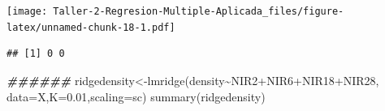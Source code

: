 \documentclass[
]{article}
\newenvironment{Shaded}{\begin{snugshade}}{\end{snugshade}}
\newcommand{\AttributeTok}[1]{\textcolor[rgb]{0.77,0.63,0.00}{#1}}
\newcommand{\DecValTok}[1]{\textcolor[rgb]{0.00,0.00,0.81}{#1}}
\newcommand{\DocumentationTok}[1]{\textcolor[rgb]{0.56,0.35,0.01}{\textbf{\textit{#1}}}}
\newcommand{\FloatTok}[1]{\textcolor[rgb]{0.00,0.00,0.81}{#1}}
\newcommand{\FunctionTok}[1]{\textcolor[rgb]{0.00,0.00,0.00}{#1}}
\newcommand{\NormalTok}[1]{#1}
\newcommand{\OtherTok}[1]{\textcolor[rgb]{0.56,0.35,0.01}{#1}}
\newcommand{\SpecialCharTok}[1]{\textcolor[rgb]{0.00,0.00,0.00}{#1}}
\newcommand{\StringTok}[1]{\textcolor[rgb]{0.31,0.60,0.02}{#1}}
\begin{document}
\begin{Shaded}
\end{Shaded}

\texttt{[image: Taller-2-Regresion-Multiple-Aplicada\_files/figure-latex/unnamed-chunk-18-1.pdf]}

\begin{Shaded}
\end{Shaded}

\begin{verbatim}
## [1] 0 0
\end{verbatim}

\begin{Shaded}
\begin{Highlighting}[]
\DocumentationTok{\#\#\#\#\#\#}
\NormalTok{ridgedensity}\OtherTok{\textless{}{-}}\FunctionTok{lmridge}\NormalTok{(density}\SpecialCharTok{\textasciitilde{}}\NormalTok{NIR2}\SpecialCharTok{+}\NormalTok{NIR6}\SpecialCharTok{+}\NormalTok{NIR18}\SpecialCharTok{+}\NormalTok{NIR28,}
                      \AttributeTok{data=}\NormalTok{X,}\AttributeTok{K=}\FloatTok{0.01}\NormalTok{,}\AttributeTok{scaling=}\StringTok{\textquotesingle{}sc\textquotesingle{}}\NormalTok{)}
\FunctionTok{summary}\NormalTok{(ridgedensity)}
\end{Highlighting}
\end{Shaded}
\end{document}

